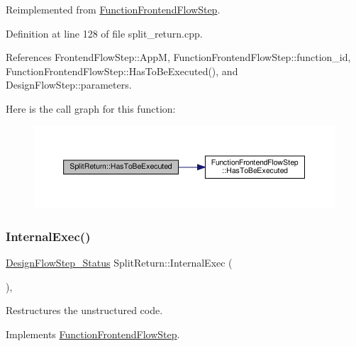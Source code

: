 Reimplemented from \hyperlink{classFunctionFrontendFlowStep_a12e786363530aa9533e4bd9380130d75}{Function\+Frontend\+Flow\+Step}.



Definition at line 128 of file split\+\_\+return.\+cpp.



References Frontend\+Flow\+Step\+::\+AppM, Function\+Frontend\+Flow\+Step\+::function\+\_\+id, Function\+Frontend\+Flow\+Step\+::\+Has\+To\+Be\+Executed(), and Design\+Flow\+Step\+::parameters.

Here is the call graph for this function\+:
\nopagebreak
\begin{figure}[H]
\begin{center}
\leavevmode
\includegraphics[width=350pt]{d1/d3d/classSplitReturn_a807a2c344e7d217d4164065e1e4e10da_cgraph}
\end{center}
\end{figure}
\mbox{\label{classSplitReturn_a13e75f94bea3e3dfc28e026af60e49db}} 
\subsubsection{\texorpdfstring{Internal\+Exec()}{InternalExec()}}
{\footnotesize\ttfamily \hyperlink{design__flow__step_8hpp_afb1f0d73069c26076b8d31dbc8ebecdf}{Design\+Flow\+Step\+\_\+\+Status} Split\+Return\+::\+Internal\+Exec (\begin{DoxyParamCaption}{ }\end{DoxyParamCaption})\hspace{0.3cm}{\ttfamily [override]}, {\ttfamily [virtual]}}



Restructures the unstructured code. 



Implements \hyperlink{classFunctionFrontendFlowStep_a00612f7fb9eabbbc8ee7e39d34e5ac68}{Function\+Frontend\+Flow\+Step}.



